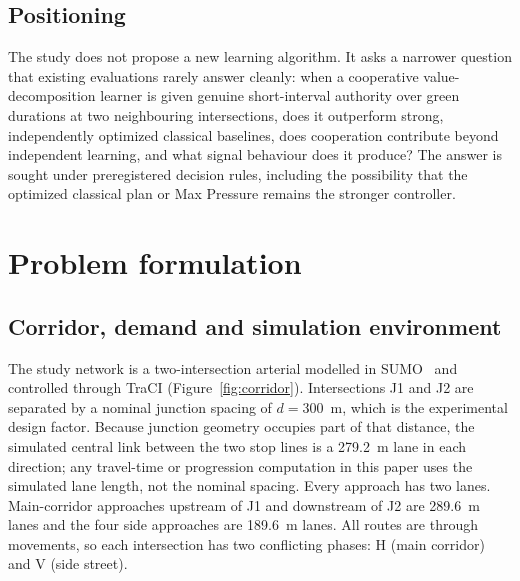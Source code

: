\documentclass[review,12pt]{elsarticle}
\begin{document}
\subsection{Positioning}
\label{subsec:positioning}

The study does not propose a new learning algorithm. It asks a narrower
question that existing evaluations rarely answer cleanly: when a
cooperative value-decomposition learner is given genuine short-interval
authority over green durations at two neighbouring intersections, does
it outperform strong, independently optimized classical baselines, does
cooperation contribute beyond independent learning, and what signal
behaviour does it produce? The answer is sought under preregistered
decision rules, including the possibility that the optimized classical
plan or Max Pressure remains the stronger controller.

\section{Problem formulation}
\label{sec:problem}

\subsection{Corridor, demand and simulation environment}
\label{subsec:environment}

The study network is a two-intersection arterial modelled in
SUMO~\cite{Lopez2018} and controlled through TraCI
(Figure~\ref{fig:corridor}). Intersections J1 and J2 are separated by a
nominal junction spacing of $d=300$~m, which is the experimental design
factor. Because junction geometry occupies part of that distance, the
simulated central link between the two stop lines is a 279.2~m lane in
each direction; any travel-time or progression computation in this
paper uses the simulated lane length, not the nominal spacing. Every
approach has two lanes. Main-corridor approaches upstream of J1 and
downstream of J2 are 289.6~m lanes and the four side approaches are
189.6~m lanes. All routes are through movements, so each intersection
has two conflicting phases: H (main corridor) and V (side street).
\end{document}
